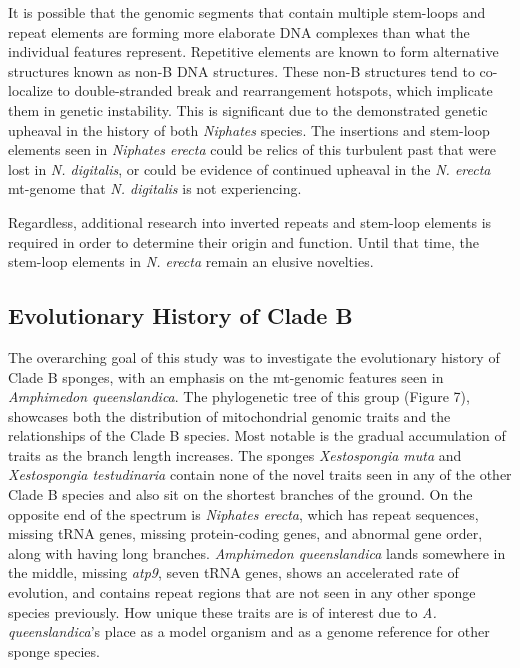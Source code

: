 \documentclass[../main.tex]{subfiles}
\begin{document}
It is possible that the genomic segments that contain multiple stem-loops and repeat elements are forming more elaborate DNA complexes than what the individual features represent. Repetitive elements are known to form alternative structures known as non-B DNA structures. These non-B structures tend to co-localize to double-stranded break and rearrangement hotspots, which implicate them in genetic instability. This is significant due to the demonstrated genetic upheaval in the history of both \emph{Niphates} species. The insertions and stem-loop elements seen in \emph{Niphates erecta} could be relics of this turbulent past that were lost in \emph{N. digitalis}, or could be evidence of continued upheaval in the \emph{N. erecta} mt-genome that \emph{N. digitalis} is not experiencing. 

Regardless, additional research into inverted repeats and stem-loop elements is required in order to determine their origin and function. Until that time, the stem-loop elements in \emph{N. erecta} remain an elusive novelties.

\subsection{Evolutionary History of Clade B}

The overarching goal of this study was to investigate the evolutionary history of Clade B sponges, with an emphasis on the mt-genomic features seen in \emph{Amphimedon queenslandica}. The phylogenetic tree of this group (Figure 7), showcases both the distribution of mitochondrial genomic traits and the relationships of the Clade B species. Most notable is the gradual accumulation of traits as the branch length increases. The sponges \emph{Xestospongia muta} and \emph{Xestospongia testudinaria} contain none of the novel traits seen in any of the other Clade B species and also sit on the shortest branches of the ground. On the opposite end of the spectrum is \emph{Niphates erecta}, which has repeat sequences, missing tRNA genes, missing protein-coding genes, and abnormal gene order, along with having long branches. \emph{Amphimedon queenslandica} lands somewhere in the middle, missing \emph{atp9}, seven tRNA genes, shows an accelerated rate of evolution, and contains repeat regions that are not seen in any other sponge species previously. How unique these traits are is of interest due to \emph{A. queenslandica}'s place as a model organism and as a genome reference for other sponge species. 
\end{document}
